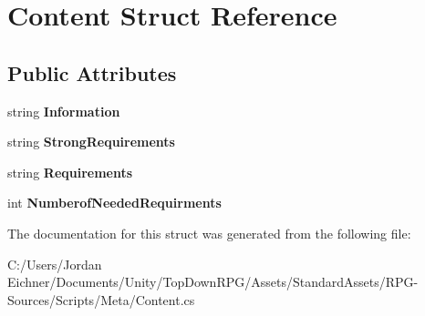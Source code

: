 \hypertarget{struct_content}{}\section{Content Struct Reference}
\label{struct_content}
\subsection*{Public Attributes}
\begin{DoxyCompactItemize}
\item 
\hypertarget{struct_content_a216f0b5c71894bbef26fc027895a8a39}{}string {\bfseries Information}\label{struct_content_a216f0b5c71894bbef26fc027895a8a39}

\item 
\hypertarget{struct_content_a8eee0e95f77c5d080aeab4a88cf5607d}{}string {\bfseries Strong\+Requirements}\label{struct_content_a8eee0e95f77c5d080aeab4a88cf5607d}

\item 
\hypertarget{struct_content_a8a0bbe78e06340e867bf694feddd4d1e}{}string {\bfseries Requirements}\label{struct_content_a8a0bbe78e06340e867bf694feddd4d1e}

\item 
\hypertarget{struct_content_a337b0374fcb40f66345cae16715e09d9}{}int {\bfseries Numberof\+Needed\+Requirments}\label{struct_content_a337b0374fcb40f66345cae16715e09d9}

\end{DoxyCompactItemize}


The documentation for this struct was generated from the following file\+:\begin{DoxyCompactItemize}
\item 
C\+:/\+Users/\+Jordan Eichner/\+Documents/\+Unity/\+Top\+Down\+R\+P\+G/\+Assets/\+Standard\+Assets/\+R\+P\+G-\/\+Sources/\+Scripts/\+Meta/Content.\+cs\end{DoxyCompactItemize}
